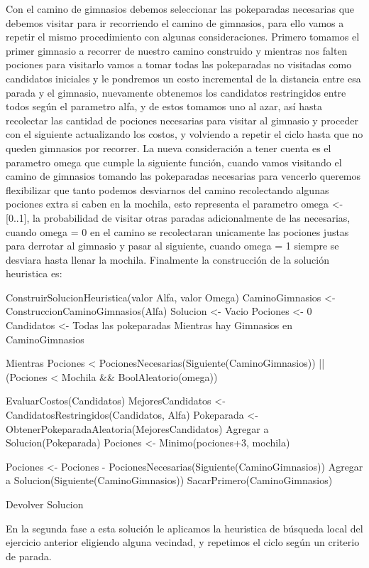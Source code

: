Con el camino de gimnasios debemos seleccionar las pokeparadas necesarias que debemos visitar para ir recorriendo el camino de gimnasios, para ello vamos a repetir el mismo procedimiento con algunas consideraciones. Primero tomamos el primer gimnasio a recorrer de nuestro camino construido y mientras nos falten pociones para visitarlo vamos a tomar todas las pokeparadas no visitadas como candidatos iniciales y le pondremos un costo incremental de la distancia entre esa parada y el gimnasio, nuevamente obtenemos los candidatos restringidos entre todos según el parametro alfa, y de estos tomamos uno al azar, así hasta recolectar las cantidad de pociones necesarias para visitar al gimnasio y proceder con el siguiente actualizando los costos, y volviendo a repetir el ciclo hasta que no queden gimnasios por recorrer. La nueva consideración a tener cuenta es el parametro omega que cumple la siguiente función, cuando vamos visitando el camino de gimnasios tomando las pokeparadas necesarias para vencerlo queremos flexibilizar que tanto podemos desviarnos del camino recolectando algunas pociones extra si caben en la mochila, esto representa el parametro omega <- [0..1], la probabilidad de visitar otras paradas adicionalmente de las necesarias, cuando omega = 0 en el camino se recolectaran unicamente las pociones justas para derrotar al gimnasio y pasar al siguiente, cuando omega = 1 siempre se desviara hasta llenar la mochila. Finalmente la construcción de la solución heuristica es:

	ConstruirSolucionHeuristica(valor Alfa, valor Omega)
	CaminoGimnasios <- ConstruccionCaminoGimnasios(Alfa)
	Solucion <- Vacio
	Pociones <- 0
	Candidatos <- Todas las pokeparadas
	Mientras hay Gimnasios en CaminoGimnasios
	
		Mientras Pociones < PocionesNecesarias(Siguiente(CaminoGimnasios)) || (Pociones < Mochila && BoolAleatorio(omega))

			EvaluarCostos(Candidatos)
			MejoresCandidatos <- CandidatosRestringidos(Candidatos, Alfa)
			Pokeparada <- ObtenerPokeparadaAleatoria(MejoresCandidatos)
			Agregar a Solucion(Pokeparada)
			Pociones <- Minimo(pociones+3, mochila)

		Pociones <- Pociones - PocionesNecesarias(Siguiente(CaminoGimnasios))
		Agregar a Solucion(Siguiente(CaminoGimnasios))
		SacarPrimero(CaminoGimnasios)

	Devolver Solucion

En la segunda fase a esta solución le aplicamos la heuristica de búsqueda local del ejercicio anterior eligiendo alguna vecindad, y repetimos el ciclo según un criterio de parada.


